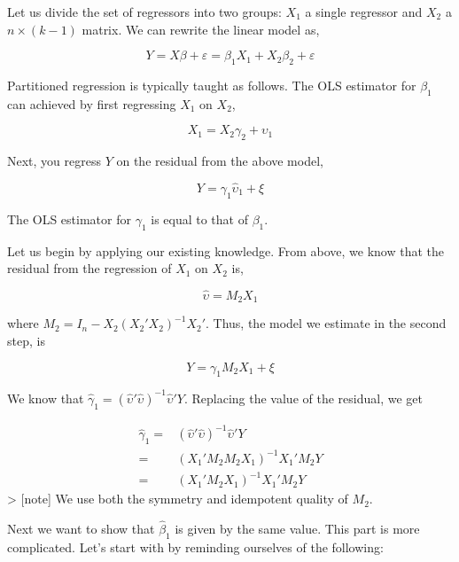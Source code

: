 \documentclass[
  letterpaper,
  DIV=11,
  numbers=noendperiod]{scrreprt}
\begin{document}
Let us divide the set of regressors into two groups: \(X_1\) a single
regressor and \(X_2\) a \(n\times (k-1)\) matrix. We can rewrite the
linear model as,

\[
Y = X\beta+ \varepsilon =\beta_1X_1+X_2\beta_2+\varepsilon
\]

Partitioned regression is typically taught as follows. The OLS estimator
for \(\beta_1\) can achieved by first regressing \(X_1\) on \(X_2\),

\[
X_1 = X_2\gamma_2+\upsilon_1
\]

Next, you regress \(Y\) on the residual from the above model,

\[
Y = \gamma_1 \hat{\upsilon}_1+\xi
\]

The OLS estimator for \(\gamma_1\) is equal to that of \(\beta_1\).

Let us begin by applying our existing knowledge. From above, we know
that the residual from the regression of \(X_1\) on \(X_2\) is,

\[
\hat{\upsilon} = M_2X_1
\]

where \(M_2 = I_n-X_2(X_2'X_2)^{-1}X_2'\). Thus, the model we estimate
in the second step, is

\[
Y = \gamma_1M_2X_1+\xi
\]

We know that
\(\hat{\gamma}_1 = (\hat{\upsilon}'\hat{\upsilon})^{-1}\hat{\upsilon}'Y\).
Replacing the value of the residual, we get

\[
\begin{align}
\hat{\gamma}_1 =& (\hat{\upsilon}'\hat{\upsilon})^{-1}\hat{\upsilon}'Y \\
=&(X_1'M_2M_2X_1)^{-1}X_1'M_2Y \\
=&(X_1'M_2X_1)^{-1}X_1'M_2Y
\end{align}
\] \textgreater{} {[}note{]} We use both the symmetry and idempotent
quality of \(M_2\).

Next we want to show that \(\hat{\beta}_1\) is given by the same value.
This part is more complicated. Let's start with by reminding ourselves
of the following:
\end{document}

